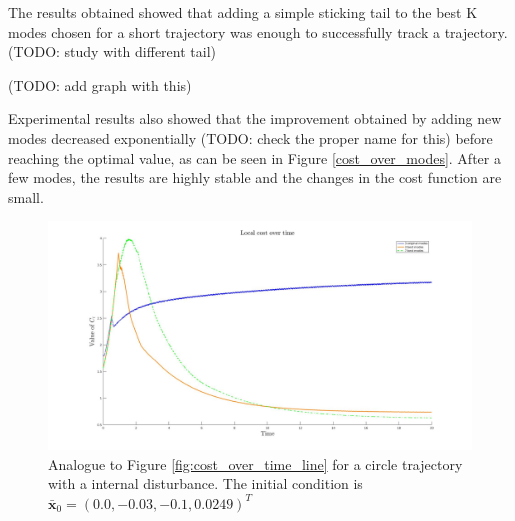 \documentclass[12,twoside]{TFG-GM}
\theoremstyle{definition}
\theoremstyle{remark}
\newcommand*\diff[1]{\bar{#1}}
\begin{document}
The results obtained showed that adding a simple sticking tail to the best K modes chosen for a short trajectory was enough to successfully track a trajectory. (TODO: study with different tail)

(TODO: add graph with this)

Experimental results also showed that the improvement obtained by adding new modes decreased exponentially (TODO: check the proper name for this) before reaching the optimal value, as can be seen in Figure \ref{cost_over_modes}. After a few modes, the results are highly stable and the changes in the cost function are small.



\begin{figure}[htb!]
\begin{center}
\includegraphics[width=16cm]{old_vs_new_circle_interior.jpg}
\caption{\label{fig:old_vs_new_circle_internal} \small Analogue to Figure \ref{fig:cost_over_time_line} for a circle trajectory with a internal disturbance. The initial condition is $\diff{\textbf{x}}_0 = (0.0, -0.03, -0.1, 0.0249)^T$}
\end{center}
\end{figure}
\end{document}
